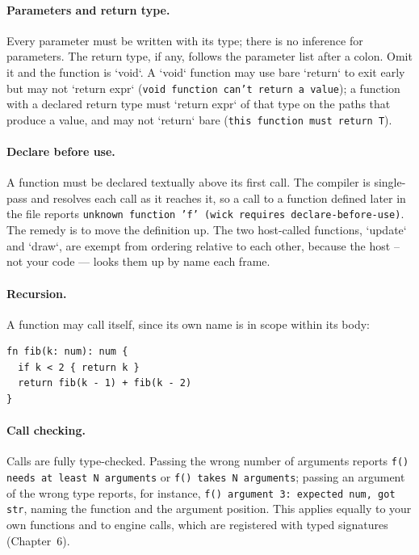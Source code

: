 \paragraph{Parameters and return type.} Every parameter must be written with
its type; there is no inference for parameters. The return type, if any,
follows the parameter list after a colon. Omit it and the function is `void`.
A `void` function may use bare `return` to exit early but may not
`return expr` (\texttt{void function can't return a value}); a function with a
declared return type must `return expr` of that type on the paths that
produce a value, and may not `return` bare
(\texttt{this function must return T}).

\paragraph{Declare before use.} A function must be declared textually above
its first call. The compiler is single-pass and resolves each call as it
reaches it, so a call to a function defined later in the file reports
\texttt{unknown function 'f' (wick requires declare-before-use)}. The remedy
is to move the definition up. The two host-called functions, `update` and
`draw`, are exempt from ordering relative to each other, because the host --
not your code --- looks them up by name each frame.

\paragraph{Recursion.} A function may call itself, since its own name is in
scope within its body:

\begin{lstlisting}[language=wick]
fn fib(k: num): num {
  if k < 2 { return k }
  return fib(k - 1) + fib(k - 2)
}
\end{lstlisting}

\paragraph{Call checking.} Calls are fully type-checked. Passing the wrong
number of arguments reports \texttt{f() needs at least N arguments} or
\texttt{f() takes N arguments}; passing an argument of the wrong type reports,
for instance, \texttt{f() argument 3: expected num, got str}, naming the
function and the argument position. This applies equally to your own functions
and to engine calls, which are registered with typed signatures (Chapter~6).

